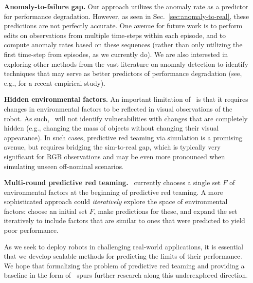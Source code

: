 {\bf Anomaly-to-failure gap.} Our approach utilizes the anomaly rate as a predictor for performance degradation. However, as seen in Sec.~\ref{sec:anomaly-to-real}, these predictions are not perfectly accurate. One avenue for future work is to perform edits on observations from multiple time-steps within each episode, and to compute anomaly rates based on these sequences (rather than only utilizing the first time-step from episodes, as we currently do). We are also interested in exploring other methods from the vast literature on anomaly detection to identify techniques that may serve as better predictors of performance degradation (see, e.g., \cite{xuuncertainty} for a recent empirical study).

{\bf Hidden environmental factors.} An important limitation of \redit~is that it requires changes in environmental factors to be reflected in visual observations of the robot. As such, \redit~will not identify vulnerabilities with changes that are completely hidden (e.g., changing the mass of objects without changing their visual appearance). In such cases, predictive red teaming via simulation is a promising avenue, but requires bridging the sim-to-real gap, which is typically very significant for RGB observations and may be even more pronounced when simulating unseen off-nominal scenarios. 

{\bf Multi-round predictive red teaming.} \redit~currently chooses a single set $F$ of environmental factors at the beginning of predictive red teaming. A more sophisticated approach could \emph{iteratively} explore the space of environmental factors: choose an initial set $F$, make predictions for these, and expand the set iteratively to include factors that are similar to ones that were predicted to yield poor performance. %


\vspace{7pt}

As we seek to deploy robots in challenging real-world applications, it is essential that we develop scalable methods for predicting the limits of their performance. We hope that formalizing the problem of predictive red teaming and providing a baseline in the form of \redit~spurs further research along this underexplored direction. 



